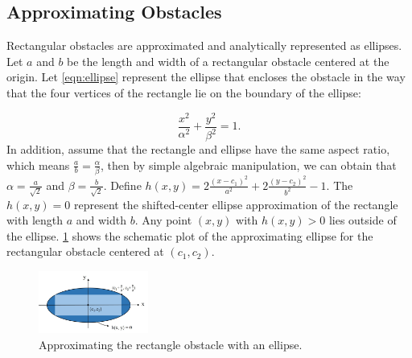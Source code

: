 \documentclass[journal]{IEEEtran}
\begin{document}
	\subsection{Approximating Obstacles}\label{subsec:ellip_approx}
    
	Rectangular obstacles are approximated and analytically represented as ellipses. %
	Let $a$ and $b$ be the length and width of a rectangular obstacle centered at the origin.
	Let \cref{eqn:ellipse} represent the ellipse that encloses the obstacle in the way that the four vertices of the rectangle lie on the boundary of the ellipse:
\addtocounter{equation}{-1}
	
	\begin{equation}\label{eqn:ellipse}
		\frac{x^2}{\alpha^2}+\frac{y^2}{\beta^2}=1.
	\end{equation}
	In addition, assume that the rectangle and ellipse have the same aspect ratio, which means $\frac{a}{b}=\frac{\alpha}{\beta}$, then by simple algebraic manipulation, we can obtain that $\alpha=\frac{a}{\sqrt{2}}$ and $\beta=\frac{b}{\sqrt{2}}$.
	Define $h(x,y)=2\frac{(x-c_1)^2}{a^2}+2\frac{(y-c_2)^2}{b^2}-1.$
	The $h(x,y)=0$ represent the shifted-center ellipse approximation of the rectangle with length $a$ and width $b$.
	Any point $(x,y)$ with $h(x,y)>0$ lies outside of the ellipse. \cref{fig:approx_ellipse} shows the schematic plot of the approximating ellipse for the rectangular obstacle centered at $(c_1,c_2)$.
 	\begin{figure}[h]
 		\centering		
 		\includegraphics[width=0.32\textwidth]{figures/ellipse}
 		\caption{Approximating the rectangle obstacle with an ellipse.}
 		\label{fig:approx_ellipse}
 	\end{figure}		
	
\end{document}
